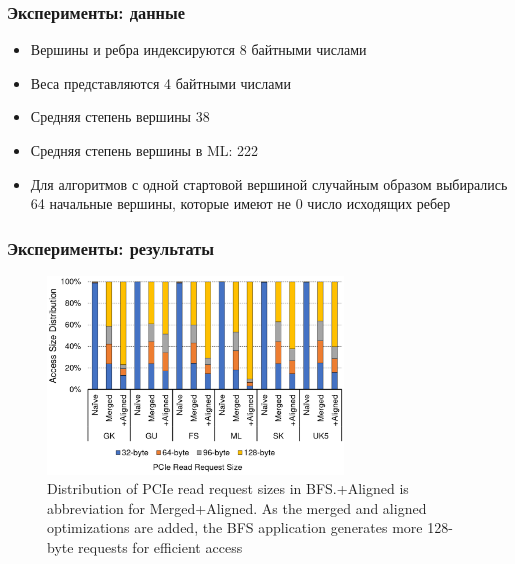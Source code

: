 \documentclass[xcolor=table,english]{beamer}
\begin{document}
\begin{frame}[fragile] \frametitle{Эксперименты: данные}
    \begin{itemize}
        \item Вершины и ребра индексируются 8 байтными числами
        \item Веса представляются 4 байтными числами
        \item Средняя степень вершины 38
        \item Средняя степень вершины в ML: 222
        \item Для алгоритмов с одной стартовой вершиной случайным образом выбирались 64 начальные вершины, которые имеют не 0 число исходящих ребер
    \end{itemize}
\end{frame}

\begin{frame}[fragile] \frametitle{Эксперименты: результаты}
     \begin{center}
    \begin{minipage}[m]{0.95\linewidth}
        \begin{figure}
            \centering
            \includegraphics[width=0.7\textwidth]{figures/request_size.png}
            \caption{Distribution of PCIe read request sizes in BFS.+Aligned is abbreviation for Merged+Aligned. As the merged and aligned optimizations are added, the BFS application generates more 128-byte requests for efficient access}
        \end{figure}
    \end{minipage}\hfill
    \end{center}
\end{frame}
\end{document}
